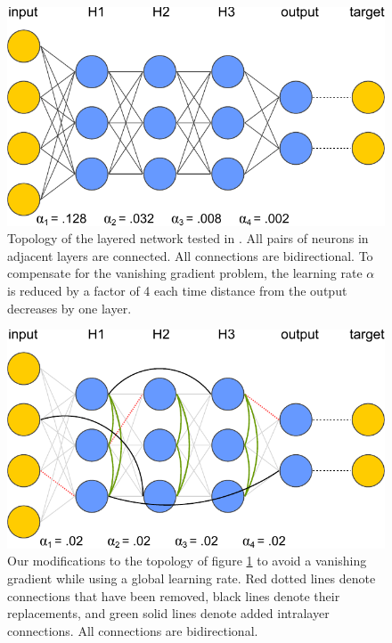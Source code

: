 \documentclass[utf8]{frontiersSCNS}
\begin{document}
\begin{figure}[h!]
\begin{center}
\includegraphics[width=\textwidth]{figures/topology1_basic.pdf}
\end{center}
\caption{Topology of the layered network tested in \citep{scellier17}. All pairs of neurons in adjacent layers are connected. All connections are bidirectional. To compensate for the vanishing gradient problem, the learning rate $\alpha$ is reduced by a factor of 4 each time distance from the output decreases by one layer.} \label{fig:top_basic}
\end{figure}
\begin{figure}[h!]
\begin{center}
\includegraphics[width=\textwidth]{figures/topology2_modified.pdf}
\end{center}
\caption{Our modifications to the topology of figure \ref{fig:top_basic} to avoid a vanishing gradient while using a global learning rate. Red dotted lines denote connections that have been removed, black lines denote their replacements, and green solid lines denote added intralayer connections. All connections are bidirectional.} \label{fig:top_sw}
\end{figure}
\end{document}
